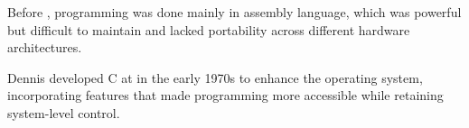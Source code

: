 \begin{NxSSSBox}
	\begin{NxIDBox}[title=From Assembly to Structured Programming]
		Before , programming was done mainly in assembly language, which was powerful but difficult to maintain and lacked portability across different hardware architectures.
	\end{NxIDBox}
	\begin{NxIDBox}[title={Dennis Ritchie’s Role in C’s Birth}]
		Dennis  developed C at  in the early 1970s to enhance the  operating system, incorporating features that made programming more accessible while retaining system-level control.
	\end{NxIDBox}
\end{NxSSSBox}

